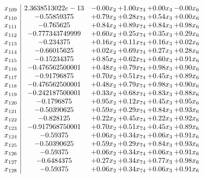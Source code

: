 \documentclass[8pt]{article}
\begin{document}
\[\begin{array}{c| c c@{\hskip 2pt} c@{\hskip 2pt} c@{\hskip 2pt} c@{\hskip 2pt} }
 x_{109}   &  2.3638513022e-13 & -0.00 x_{2} & +  1.00 x_{74} & +  0.00 x_{3} & -0.00 x_{6}\\
 x_{110}   &  -0.55859375 & +  0.79 x_{2} & +  0.28 x_{74} & +  0.54 x_{3} & +  0.00 x_{6}\\
 x_{111}   &  -0.765625 & +  0.84 x_{2} & +  0.89 x_{74} & +  0.84 x_{3} & +  0.98 x_{6}\\
 x_{112}   &  -0.777343749999 & +  0.60 x_{2} & +  0.25 x_{74} & +  0.35 x_{3} & +  0.29 x_{6}\\
 x_{113}   &  -0.234375 & +  0.16 x_{2} & +  0.11 x_{74} & +  0.16 x_{3} & +  0.02 x_{6}\\
 x_{114}   &  -0.66015625 & +  0.02 x_{2} & +  0.69 x_{74} & +  0.27 x_{3} & +  0.28 x_{6}\\
 x_{115}   &  -0.15234375 & +  0.85 x_{2} & +  0.62 x_{74} & +  0.60 x_{3} & +  0.91 x_{6}\\
 x_{116}   &  -0.476562500001 & +  0.48 x_{2} & +  0.79 x_{74} & +  0.98 x_{3} & +  0.90 x_{6}\\
 x_{117}   &  -0.91796875 & +  0.70 x_{2} & +  0.51 x_{74} & +  0.45 x_{3} & +  0.89 x_{6}\\
 x_{118}   &  -0.476562500001 & +  0.48 x_{2} & +  0.79 x_{74} & +  0.98 x_{3} & +  0.90 x_{6}\\
 x_{119}   &  -0.242187500001 & +  0.33 x_{2} & +  0.68 x_{74} & +  0.83 x_{3} & +  0.88 x_{6}\\
 x_{120}   &  -0.1796875 & +  0.95 x_{2} & +  0.12 x_{74} & +  0.45 x_{3} & +  0.95 x_{6}\\
 x_{121}   &  -0.50390625 & +  0.59 x_{2} & +  0.29 x_{74} & +  0.84 x_{3} & +  0.93 x_{6}\\
 x_{122}   &  -0.828125 & +  0.22 x_{2} & +  0.45 x_{74} & +  0.22 x_{3} & +  0.92 x_{6}\\
 x_{123}   &  -0.917968750001 & +  0.70 x_{2} & +  0.51 x_{74} & +  0.45 x_{3} & +  0.89 x_{6}\\
 x_{124}   &  -0.59375 & +  0.06 x_{2} & +  0.34 x_{74} & +  0.06 x_{3} & +  0.91 x_{6}\\
 x_{125}   &  -0.50390625 & +  0.59 x_{2} & +  0.29 x_{74} & +  0.84 x_{3} & +  0.93 x_{6}\\
 x_{126}   &  -0.59375 & +  0.06 x_{2} & +  0.34 x_{74} & +  0.06 x_{3} & +  0.91 x_{6}\\
 x_{127}   &  -0.6484375 & +  0.27 x_{2} & +  0.34 x_{74} & +  0.77 x_{3} & +  0.98 x_{6}\\
 x_{128}   &  -0.59375 & +  0.06 x_{2} & +  0.34 x_{74} & +  0.06 x_{3} & +  0.91 x_{6}\\

\end{array}\]
\end{document}
